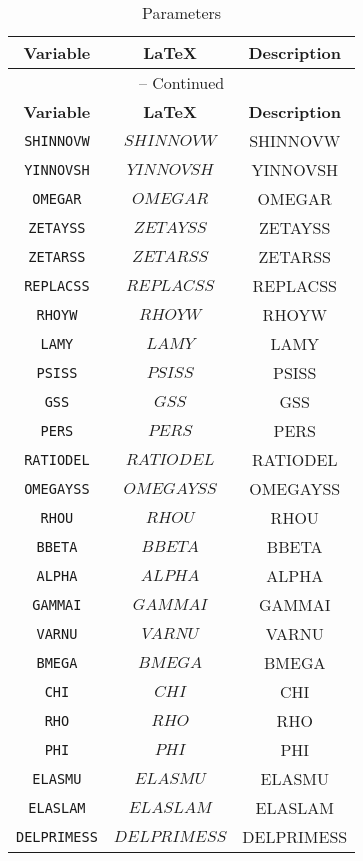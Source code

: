 \begin{center}
\begin{longtable}{ccc}
\caption{Parameters}\\%
\hline%
\multicolumn{1}{c}{\textbf{Variable}} &
\multicolumn{1}{c}{\textbf{\LaTeX}} &
\multicolumn{1}{c}{\textbf{Description}}\\%
\hline\hline%
\endfirsthead
\multicolumn{3}{c}{{\tablename} \thetable{} -- Continued}\\%
\hline%
\multicolumn{1}{c}{\textbf{Variable}} &
\multicolumn{1}{c}{\textbf{\LaTeX}} &
\multicolumn{1}{c}{\textbf{Description}}\\%
\hline\hline%
\endhead
\texttt{SHINNOVW} & $SHINNOVW$ & SHINNOVW\\
\texttt{YINNOVSH} & $YINNOVSH$ & YINNOVSH\\
\texttt{OMEGAR} & $OMEGAR$ & OMEGAR\\
\texttt{ZETAYSS} & $ZETAYSS$ & ZETAYSS\\
\texttt{ZETARSS} & $ZETARSS$ & ZETARSS\\
\texttt{REPLACSS} & $REPLACSS$ & REPLACSS\\
\texttt{RHOYW} & $RHOYW$ & RHOYW\\
\texttt{LAMY} & $LAMY$ & LAMY\\
\texttt{PSISS} & $PSISS$ & PSISS\\
\texttt{GSS} & $GSS$ & GSS\\
\texttt{PERS} & $PERS$ & PERS\\
\texttt{RATIODEL} & $RATIODEL$ & RATIODEL\\
\texttt{OMEGAYSS} & $OMEGAYSS$ & OMEGAYSS\\
\texttt{RHOU} & $RHOU$ & RHOU\\
\texttt{BBETA} & $BBETA$ & BBETA\\
\texttt{ALPHA} & $ALPHA$ & ALPHA\\
\texttt{GAMMAI} & $GAMMAI$ & GAMMAI\\
\texttt{VARNU} & $VARNU$ & VARNU\\
\texttt{BMEGA} & $BMEGA$ & BMEGA\\
\texttt{CHI} & $CHI$ & CHI\\
\texttt{RHO} & $RHO$ & RHO\\
\texttt{PHI} & $PHI$ & PHI\\
\texttt{ELASMU} & $ELASMU$ & ELASMU\\
\texttt{ELASLAM} & $ELASLAM$ & ELASLAM\\
\texttt{DELPRIMESS} & $DELPRIMESS$ & DELPRIMESS\\

\end{longtable}
\end{center}
